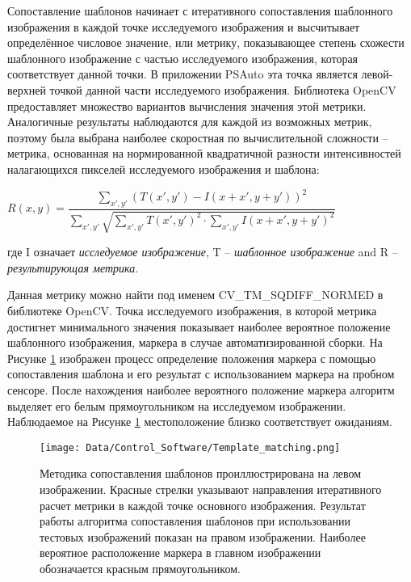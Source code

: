 Сопоставление шаблонов начинает с итеративного сопоставления шаблонного изображения в каждой точке исследуемого изображения и высчитывает определённое числовое значение, или метрику, показывающее степень схожести шаблонного изображение с частью исследуемого изображения, которая соответствует данной точки. В приложении PSAuto эта точка является левой-верхней точкой данной части исследуемого изображения. Библиотека OpenCV предоставляет множество вариантов вычисления значения этой метрики. Аналогичные результаты наблюдаются для каждой из возможных метрик, поэтому была выбрана наиболее скоростная по вычислительной сложности -- метрика, основанная на нормированной квадратичной разности интенсивностей налагающихся пикселей исследуемого изображения и шаблона:

\begin{center}
$R(x,y)=\dfrac{\sum_{x',y'}^{}(T(x',y')-I(x+x',y+y'))^{2}}{\sum_{x',y'}^{}\sqrt{\sum_{x',y'}^{}T(x',y')^{2}\cdot\sum_{x',y'}^{}I(x+x',y+y')^{2}}}$
\end{center}
где I означает \emph{исследуемое изображение}, T -- \emph{шаблонное изображение} and R -- \emph{результирующая метрика}.


Данная метрику можно найти под именем CV\_TM\_SQDIFF\_NORMED в библиотеке OpenCV. Точка исследуемого изображения, в которой метрика достигнет минимального значения показывает наиболее вероятное положение шаблонного изображения, маркера в случае автоматизированной сборки. На Рисунке \ref{fig:template_matching} изображен процесс определение положения маркера с помощью сопоставления шаблона и его результат с использованием маркера на пробном сенсоре. После нахождения наиболее вероятного положение маркера алгоритм выделяет его белым прямоугольником на исследуемом изображении. Наблюдаемое на Рисунке \ref{fig:template_matching} местоположение близко соответствует ожиданиям.

\begin{figure}[ht]\centering
\texttt{[image: Data/Control\_Software/Template\_matching.png]}
\caption{Методика сопоставления шаблонов проиллюстрирована на левом изображении. Красные стрелки указывают направления итеративного расчет метрики в каждой точке основного изображения. Результат работы алгоритма сопоставления шаблонов при использовании тестовых изображений показан на правом изображении. Наиболее вероятное расположение маркера в главном изображении обозначается красным прямоугольником.
}
\label{fig:template_matching}
\end{figure}


